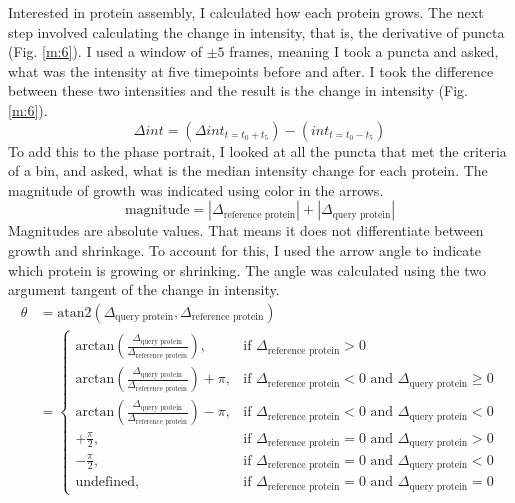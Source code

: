 Interested in protein assembly, I calculated how each protein grows. The next step involved calculating the change in intensity, that is, the derivative of puncta (Fig. \ref{m:6}). I used a window of $\pm5$ frames, meaning I took a puncta and asked, what was the intensity at five timepoints before and after. I took the difference between these two intensities and the result is the change in intensity (Fig. \ref{m:6}).
\begin{equation}
\Delta int = (\Delta {int}_{t =t_0+t_5}) - ({int}_{t =t_0-t_5})
\end{equation}
To add this to the phase portrait, I looked at all the puncta that met the criteria of a bin, and asked, what is the median intensity change for each protein. The magnitude of growth was indicated using color in the arrows.
\begin{equation}
\text{magnitude} = |\Delta_\text{reference protein}| + |\Delta_\text{query protein}|
\end{equation}
Magnitudes are absolute values. That means it does not differentiate between growth and shrinkage. To account for this, I used the arrow angle to indicate which protein is growing or shrinking. The angle was calculated using the two argument tangent of the change in intensity.
\begin{equation}
\begin{aligned}
\theta &= \text{atan2}(\Delta_\text{query protein}, \Delta_\text{reference protein})\\&=
\left\{\begin{array}{ll}

\text{arctan}(\frac{\Delta_\text{query protein}}{\Delta_\text{reference protein}}), & \text{if }\Delta_\text{reference protein} > 0\\

\text{arctan}(\frac{\Delta_\text{query protein}}{\Delta_\text{reference protein}})+\pi, & \text{if }\Delta_\text{reference protein} < 0 \text{ and }\Delta_\text{query protein} \ge 0\\

\text{arctan}(\frac{\Delta_\text{query protein}}{\Delta_\text{reference protein}})-\pi, & \text{if }\Delta_\text{reference protein} < 0 \text{ and }\Delta_\text{query protein} < 0\\

+\frac{\pi}{2}, & \text{if }\Delta_\text{reference protein} =0 \text{ and }\Delta_\text{query protein}>0\\

-\frac{\pi}{2}, & \text{if }\Delta_\text{reference protein} =0 \text{ and }\Delta_\text{query protein}<0\\

\text{undefined}, & \text{if }\Delta_\text{reference protein} =0 \text{ and }\Delta_\text{query protein}=0

\end{array}\right.
\end{aligned}
\end{equation}


